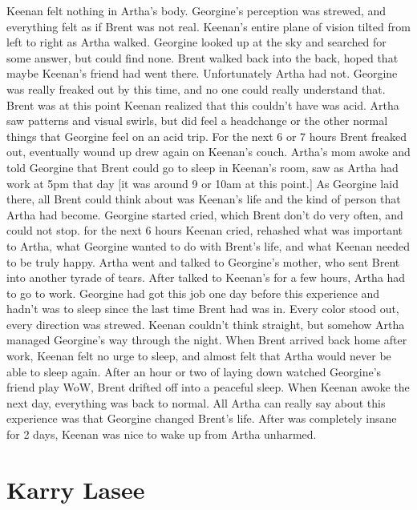 \documentclass[12pt]{book}
\begin{document}
Keenan felt nothing in Artha's body. Georgine's perception was strewed, and everything felt as if Brent was not real. Keenan's entire plane of vision tilted from left to right as Artha walked. Georgine looked up at the sky and searched for some answer, but could find none. Brent walked back into the back, hoped that maybe Keenan's friend had went there. Unfortunately Artha had not. Georgine was really freaked out by this time, and no one could really understand that. Brent was at this point Keenan realized that this couldn't have was acid. Artha saw patterns and visual swirls, but did feel a headchange or the other normal things that Georgine feel on an acid trip. For the next 6 or 7 hours Brent freaked out, eventually wound up drew again on Keenan's couch. Artha's mom awoke and told Georgine that Brent could go to sleep in Keenan's room, saw as Artha had work at 5pm that day [it was around 9 or 10am at this point.] As Georgine laid there, all Brent could think about was Keenan's life and the kind of person that Artha had become. Georgine started cried, which Brent don't do very often, and could not stop. for the next 6 hours Keenan cried, rehashed what was important to Artha, what Georgine wanted to do with Brent's life, and what Keenan needed to be truly happy. Artha went and talked to Georgine's mother, who sent Brent into another tyrade of tears. After talked to Keenan's for a few hours, Artha had to go to work. Georgine had got this job one day before this experience and hadn't was to sleep since the last time Brent had was in. Every color stood out, every direction was strewed. Keenan couldn't think straight, but somehow Artha managed Georgine's way through the night. When Brent arrived back home after work, Keenan felt no urge to sleep, and almost felt that Artha would never be able to sleep again. After an hour or two of laying down watched Georgine's friend play WoW, Brent drifted off into a peaceful sleep. When Keenan awoke the next day, everything was back to normal. All Artha can really say about this experience was that Georgine changed Brent's life. After was completely insane for 2 days, Keenan was nice to wake up from Artha unharmed.



\chapter{Karry Lasee}
\end{document}
